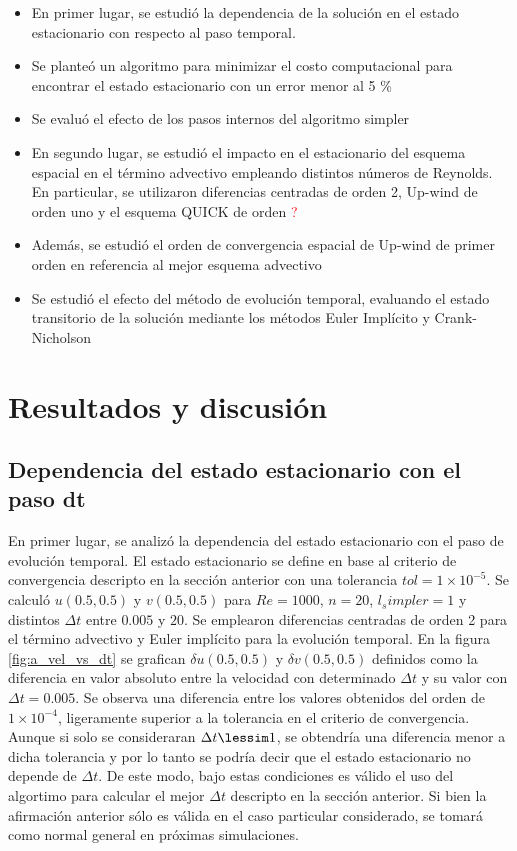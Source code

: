 \documentclass[aps,prb,twocolumn,superscriptaddress,floatfix,longbibliography,10pt]{revtex4-2}
\newif\ifptitle
\newif\ifpnumber
\newcounter{para}
\newcommand\ptitle[1]{\par\refstepcounter{para}
{\ifpnumber{\noindent\textcolor{lightgray}{\textbf{\thepara}}\indent}\fi}
{\ifptitle{\textbf{[{#1}]}}\fi}}
\begin{document}
\ptitle{Resumen de lo que se va a estudiar}
\begin{itemize}
  \item En primer lugar, se estudió la dependencia de la solución en el estado estacionario con respecto al paso temporal.
  \item Se planteó un algoritmo para minimizar el costo computacional para encontrar el estado estacionario con un error menor al 5 \%
  \item Se evaluó el efecto de los pasos internos del algoritmo simpler
  \item En segundo lugar, se estudió el impacto en el estacionario del esquema espacial en el término advectivo empleando distintos números de Reynolds. En particular, se utilizaron diferencias centradas de orden 2, Up-wind de orden uno y el esquema QUICK de orden \textcolor{red}{?}
  \item Además, se estudió el orden de convergencia espacial de Up-wind de primer orden en referencia al mejor esquema advectivo
  \item Se estudió el efecto del método de evolución temporal, evaluando el estado transitorio de la solución mediante los métodos Euler Implícito y Crank-Nicholson
\end{itemize}



\section{Resultados y discusión}


\subsection{Dependencia del estado estacionario con el paso dt}

En primer lugar, se analizó la dependencia del estado estacionario con el paso de evolución temporal. El estado estacionario se define en base al criterio de convergencia descripto en la sección anterior con una tolerancia $tol = 1 \times 10^{-5}$. Se calculó $u(0.5,0.5)$ y $v(0.5,0.5)$ para $Re = 1000$, $n = 20$, $l_simpler = 1$ y distintos $\Delta t$ entre $0.005$ y $20$. Se emplearon diferencias centradas de orden 2 para el término advectivo y Euler implícito para la evolución temporal. En la figura \ref{fig:a_vel_vs_dt} se grafican $\delta u(0.5,0.5)$ y $\delta v(0.5,0.5)$ definidos como la diferencia en valor absoluto entre la velocidad con determinado $\Delta t$ y su valor con $\Delta t = 0.005$. Se observa una diferencia entre los valores obtenidos del orden de $1 \times 10^{-4}$, ligeramente superior a la tolerancia en el criterio de convergencia. Aunque si solo se consideraran $\Delta t \lessim 1$, se obtendría una diferencia menor a dicha tolerancia y por lo tanto se podría decir que el estado estacionario no depende de $\Delta t$. De este modo, bajo estas condiciones es válido el uso del algortimo para calcular el mejor $\Delta t$ descripto en la sección anterior. Si bien la afirmación anterior sólo es válida en el caso particular considerado, se tomará como normal general en próximas simulaciones.
\end{document}
